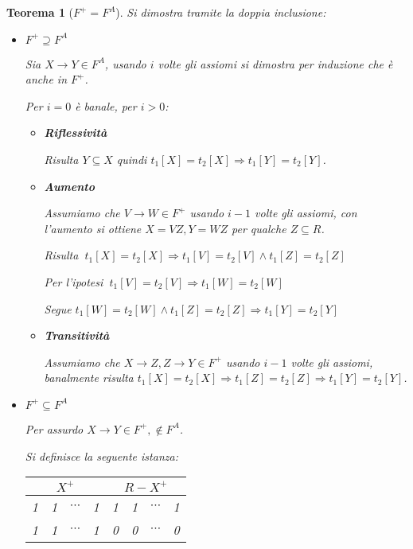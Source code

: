 \documentclass{article}
\newtheorem{theorem}{Teorema}
\begin{document}
\begin{theorem}[$F^+=F^A$] Si dimostra tramite la doppia inclusione:
    \begin{itemize}
        \item $F^+\supseteq F^A$

            Sia $X\rightarrow Y\in F^A$, usando $i$ volte gli assiomi si dimostra per induzione che è anche in $F^+$.

            Per $i=0$ è banale, per $i>0$:
                \begin{itemize}
                    \item \textbf{Riflessività}

                        Risulta $Y\subseteq X$ quindi $t_1[X]=t_2[X]\Rightarrow t_1[Y]=t_2[Y]$.

                    \item \textbf{Aumento}

                        Assumiamo che $V\rightarrow W\in F^+$ usando $i-1$ volte gli assiomi, con l'aumento si ottiene $X=VZ,Y=WZ$ per qualche $Z\subseteq R$.\newline

                        Risulta $\ t_1[X]=t_2[X]\Rightarrow t_1[V]=t_2[V]\wedge t_1[Z]=t_2[Z]$
                        
                        Per l'ipotesi $\ t_1[V]=t_2[V]\Rightarrow t_1[W]=t_2[W]$

                        Segue $t_1[W]=t_2[W]\wedge t_1[Z]=t_2[Z]\Rightarrow t_1[Y]=t_2[Y]$
                        

                    \item \textbf{Transitività}

                        Assumiamo che $X\rightarrow Z,Z\rightarrow Y\in F^+$ usando $i-1$ volte gli assiomi, banalmente risulta $t_1[X]=t_2[X]\Rightarrow t_1[Z]=t_2[Z]\Rightarrow t_1[Y]=t_2[Y]$.
                    
                \end{itemize}

        \item $F^+\subseteq F^A$

        Per assurdo $X\rightarrow Y\in F^+,\notin F^A$.

        Si definisce la seguente istanza:

        \begin{table}[ht]
            \centering
            \begin{tabular}{c|c|c|c|c|c|c|c}
                 \multicolumn{4}{c}{$X^+$} & \multicolumn{4}{|c}{$R-X^+$} \\
                 \hline
                1 & 1 & $\cdots$ & 1 & 1 & 1 & $\cdots$ & 1\\
                 \hline
                1 & 1 & $\cdots$ & 1 & 0 & 0 & $\cdots$ & 0\\
            \end{tabular}
        \end{table}


\end{itemize}
\end{theorem}
\end{document}
